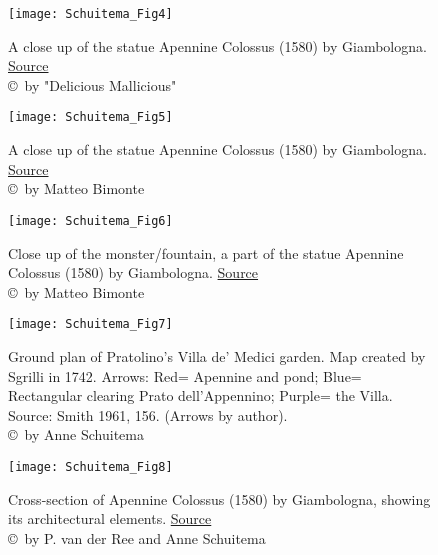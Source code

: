 \begin{figure}[]
	\texttt{[image: Schuitema\_Fig4]}
	\centering
	\caption{A close up of the statue Apennine Colossus (1580) by Giambologna. \href{https://www.boredpanda.com/appennino-sculpture-colossus-giambologna-florence-italy/}{Source}
		{\normalfont\scriptsize \\ \copyright\ by "Delicious Mallicious"
	}}
	\label{fig:Fig4}

\end{figure}

 \begin{figure}[]
 	\texttt{[image: Schuitema\_Fig5]}
 	\centering
 	\caption{A close up of the statue Apennine Colossus (1580) by Giambologna. \href{https://mymodernmet.com/giambologna-colosso-dell-appennino/}{Source}
 		{\normalfont\scriptsize \\ \copyright\ by Matteo Bimonte
 	}}
 	\label{fig:Fig5}

 \end{figure}

\begin{figure}[]
	\texttt{[image: Schuitema\_Fig6]}
	\centering
	\caption{Close up of the monster/fountain, a part of the statue Apennine Colossus (1580) by Giambologna. \href{https://mymodernmet.com/giambologna-colosso-dell-appennino/}{Source}
		{\normalfont\scriptsize \\ \copyright\ by Matteo Bimonte
	}}
	\label{fig:Fig6}

\end{figure}

\begin{figure}[]
	\texttt{[image: Schuitema\_Fig7]}
	\caption{Ground plan of Pratolino’s Villa de’ Medici garden. Map created by Sgrilli in 1742. Arrows: Red= Apennine and pond; Blue= Rectangular clearing Prato dell’Appennino; Purple= the Villa. Source: Smith 1961, 156. (Arrows by author).
		{\normalfont\scriptsize \\ \copyright\ by Anne Schuitema
	}}
	\label{fig:Fig7}

\end{figure}

\begin{figure}[]
	\texttt{[image: Schuitema\_Fig8]}
	\caption{Cross-section of Apennine Colossus (1580) by Giambologna, showing its architectural elements. \href{https://unusualplaces.org/the-appennine-colossus/}{Source}
		\normalfont\scriptsize \\ \copyright\ by P. van der Ree and Anne Schuitema
	}
	\label{fig:Fig8}

\end{figure}

